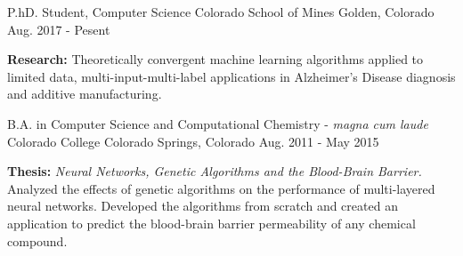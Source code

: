 

\begin{cventries}

  \cventry
    {P.hD. Student, Computer Science}
    {Colorado School of Mines}
    {Golden, Colorado}
    {Aug. 2017 - Pesent}
    {
      \begin{cvitems}
      \item {\textbf{Research:} Theoretically convergent machine learning algorithms applied to limited data, multi-input-multi-label applications in Alzheimer's Disease diagnosis and additive manufacturing.}
      \end{cvitems}
    }

  \cventry
    {B.A. in Computer Science and Computational Chemistry - \textit{magna cum laude}} %
    {Colorado College} %
    {Colorado Springs, Colorado} %
    {Aug. 2011 - May 2015} %
    {
      \begin{cvitems} %
      \item {\textbf{Thesis:} \textit{Neural Networks, Genetic Algorithms and the Blood-Brain Barrier.} Analyzed the effects of genetic algorithms on the performance of multi-layered neural networks. Developed the algorithms from scratch and created an application to predict the blood-brain barrier permeability of any chemical compound.}
      \end{cvitems}
    }

\end{cventries}

